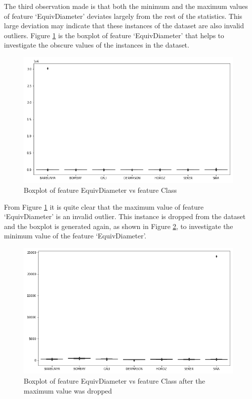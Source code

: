 \documentclass[10pt, conference]{IEEEtran}
\begin{document}
The third observation made is that both the minimum and the maximum values of feature `EquivDiameter' deviates
largely from the rest of the statistics. This large deviation may indicate that these instances of the dataset
are also invalid outliers. Figure \ref{EquivDiameter boxplot before} is the boxplot of feature `EquivDiameter'
that helps to investigate the obscure values of the instances in the dataset.
\begin{figure}[H]
    \centerline{\includegraphics[scale=0.35]{../Plots/EquivDiameter outlier boxplot.png}}
    \caption{Boxplot of feature EquivDiameter vs feature Class}
    \label{EquivDiameter boxplot before}
\end{figure}

From Figure \ref{EquivDiameter boxplot before} it is quite clear that the maximum value of feature `EquivDiameter'
is an invalid outlier. This instance is dropped from the dataset and the boxplot is generated again, as shown
in Figure \ref{EquivDiameter boxplot before 2}, to investigate the minimum value of the feature `EquivDiameter'.
\begin{figure}[H]
    \centerline{\includegraphics[scale=0.35]{../Plots/EquivDiameter outlier boxplot 2.png}}
    \caption{Boxplot of feature EquivDiameter vs feature Class after the maximum value was dropped}
    \label{EquivDiameter boxplot before 2}
\end{figure}
\end{document}
